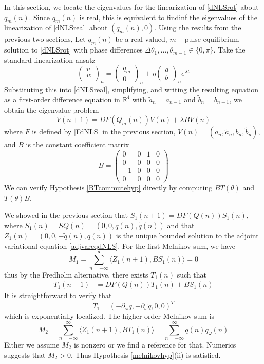 \documentclass[12pt]{article}
\def\R{{\mathbb R}}
\begin{document}
In this section, we locate the eigenvalues for the linearization of \eqref{dNLSrot} about $q_m(n)$. Since $q_m(n)$ is real, this is equivalent to findinf the eigenvalues of the linearization of \eqref{dNLSreal} about $(q_m(n), 0)$. 
Using the results from the previous two sections, Let $q_m(n)$ be a real-valued, $m-$pulse equilibrium solution to \eqref{dNLSrot} with phase differences $\Delta \theta_1, \dots, \theta_{m-1} \in \{0, \pi\}$. Take the standard linearization ansatz
\[
\begin{pmatrix}v \\ w \\ \end{pmatrix}_n = 
\begin{pmatrix}q_m \\ 0 \end{pmatrix}_n + 
\eta \begin{pmatrix}a \\ b \end{pmatrix}_n e^{\lambda t}
\]
Substituting this into \eqref{dNLSreal}, simplifying, and writing the resulting equation as a first-order difference equation in $\R^4$ with $\tilde{a}_n = a_{n-1}$ and $\tilde{b}_n = b_{n-1}$, we obtain the eigenvalue problem 
\begin{equation}\label{dNLSEVP}
V(n+1) = DF(Q_m(n)) V(n) + \lambda B V(n)
\end{equation}
where $F$ is defined by \eqref{FdNLS} in the previous section, $V(n) = (a_n, \tilde{a}_n, b_n, \tilde{b}_n)$, and $B$ is the constant coefficient matrix 
\[
B = 
\begin{pmatrix}
0 & 0 & 1 & 0 \\
0 & 0 & 0 & 0 \\
-1 & 0 & 0 & 0 \\
0 & 0 & 0 & 0
\end{pmatrix}
\]
We can verify Hypothesis \ref{BTcommutehyp} directly by computing $B T(\theta)$ and $T(\theta) B$.

We showed in the previous section that $S_1(n+1) = DF(Q(n)) S_1(n)$, where $S_1(n) = S Q(n) = (0, 0, q(n), \tilde{q}(n))$ and that $Z_1(n) = (0, 0, -\tilde{q}(n), q(n))$ is the unique bounded solution to the adjoint variational equation \eqref{adjvareqdNLS}. For the first Melnikov sum, we have
\[
M_1 = \sum_{n=-\infty}^\infty \langle Z_1(n+1), B S_1(n) \rangle = 0
\]
thus by the Fredholm alternative, there exists $T_1(n)$ such that 
\begin{align*}
T_1(n+1) &= DF(Q(n)) T_1(n) + B S_1(n)
\end{align*}
It is straightforward to verify that 
\begin{equation}\label{defT1}
T_1 = (-\partial_\omega q, -\partial_\omega \tilde{q}, 0, 0)^T
\end{equation}
which is exponentially localized. The higher order Melnikov sum is
\[
M_2 = \sum_{n=-\infty}^\infty \langle Z_1(n+1), B T_1(n) \rangle =
\sum_{n=-\infty}^\infty q(n) q_\omega(n)
\]
Either we assume $M_2$ is nonzero or we find a reference for that. Numerics suggests that $M_2 > 0$. Thus Hypothesis \ref{melnikovhyp}(ii) is satisfied.
\end{document}
